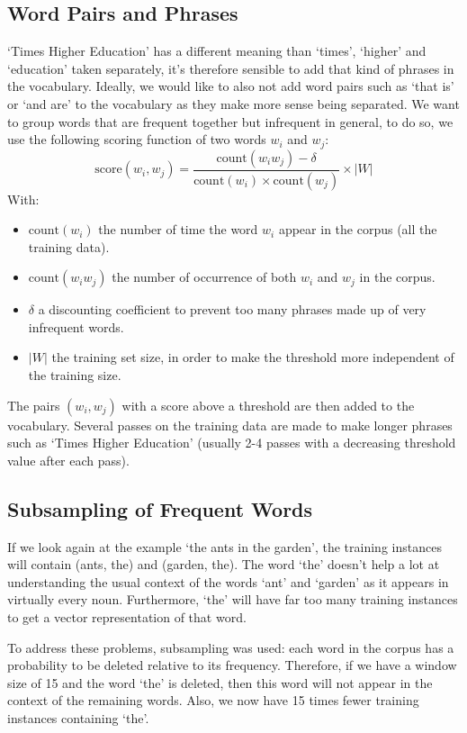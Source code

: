 \subsection{Word Pairs and Phrases}
`Times Higher Education' has a different meaning than `times', `higher' and `education' taken separately, it's therefore sensible to add that kind of phrases in the vocabulary. Ideally, we would like to also not add word pairs such as `that is' or `and are' to the vocabulary as they make more sense being separated. We want to group words that are frequent together but infrequent in general, to do so, we use the following scoring function of two words $w_i$ and $w_j$:
\begin{equation}
    \text{score}(w_i, w_j) = \frac{\text{count}(w_iw_j) - \delta}{\text{count}(w_i)\times \text{count}(w_j)}\times |W|
\end{equation}
With: 
\begin{itemize}[topsep=0pt]
    \item $\text{count}(w_i)$ the number of time the word $w_i$ appear in the corpus (all the training data).
    \item $\text{count}(w_iw_j)$ the number of occurrence of both $w_i$ and $w_j$ in the corpus. 
    \item $\delta$ a discounting coefficient to prevent too many phrases made up of very infrequent words.
    \item $|W|$ the training set size, in order to make the threshold more independent of the training size.
\end{itemize}

The pairs $(w_i, w_j)$ with a score above a threshold are then added to the vocabulary. Several passes on the training data are made to make longer phrases such as `Times Higher Education' (usually 2-4 passes with a decreasing threshold value after each pass).

\subsection{Subsampling of Frequent Words}
If we look again at the example `the ants in the garden', the training instances will contain (ants, the) and (garden, the). The word `the' doesn't help a lot at understanding the usual context of the words `ant' and `garden' as it appears in virtually every noun. Furthermore, `the' will have far too many training instances to get a vector representation of that word.

To address these problems, subsampling was used: each word in the corpus has a probability to be deleted relative to its frequency. Therefore, if we have a window size of 15 and the word `the' is deleted, then this word will not appear in the context of the remaining words. Also, we now have 15 times fewer training instances containing `the'.

